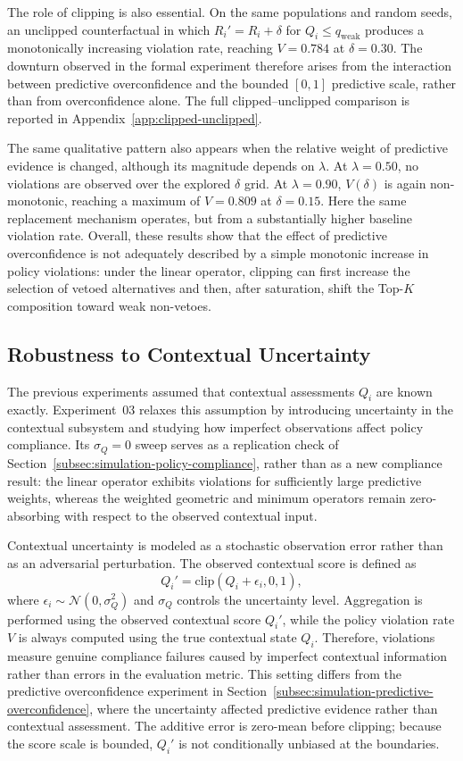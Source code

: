 \documentclass[mathematics,article,submit,moreauthors]{Definitions/mdpi}
\begin{document}
The role of clipping is also essential. On the same populations and
random seeds, an unclipped counterfactual in which
$R_i'=R_i+\delta$ for $Q_i\le q_{\mathrm{weak}}$ produces a monotonically
increasing violation rate, reaching $V=0.784$ at $\delta=0.30$. The
downturn observed in the formal experiment therefore arises from the
interaction between predictive overconfidence and the bounded
$[0,1]$ predictive scale, rather than from overconfidence alone. The
full clipped--unclipped comparison is reported in
Appendix~\ref{app:clipped-unclipped}.

The same qualitative pattern also appears when the relative weight of
predictive evidence is changed, although its magnitude depends on
$\lambda$. At $\lambda=0.50$, no violations are observed over the
explored $\delta$ grid. At $\lambda=0.90$, $V(\delta)$ is again
non-monotonic, reaching a maximum of $V=0.809$ at $\delta=0.15$.
Here the same replacement mechanism operates, but from a substantially
higher baseline violation rate. Overall, these results show that the
effect of predictive overconfidence is not adequately described by a
simple monotonic increase in policy violations: under the linear
operator, clipping can first increase the selection of vetoed
alternatives and then, after saturation, shift the Top-$K$ composition
toward weak non-vetoes.

\subsection{Robustness to Contextual Uncertainty}
\label{subsec:simulation-contextual-uncertainty}

{\color{blue}The previous experiments assumed that contextual assessments
$Q_i$ are known exactly. Experiment~03 relaxes this assumption by
introducing uncertainty in the contextual subsystem and studying how
imperfect observations affect policy compliance. Its $\sigma_Q=0$ sweep
serves as a replication check of
Section~\ref{subsec:simulation-policy-compliance}, rather than as a new
compliance result: the linear operator exhibits violations for sufficiently
large predictive weights, whereas the weighted geometric and minimum
operators remain zero-absorbing with respect to the observed contextual
input.}

Contextual uncertainty is modeled as a stochastic observation error rather
than as an adversarial perturbation. The observed contextual score is
defined as
\[
Q_i'=\mathrm{clip}(Q_i+\epsilon_i,0,1),
\]
where $\epsilon_i\sim\mathcal{N}(0,\sigma_Q^2)$ and $\sigma_Q$ controls
the uncertainty level. Aggregation is performed using the observed
contextual score $Q_i'$, while the policy violation rate $V$ is always
computed using the true contextual state $Q_i$. Therefore, violations
measure genuine compliance failures caused by imperfect contextual
information rather than errors in the evaluation metric. This setting
differs from the predictive overconfidence experiment in
Section~\ref{subsec:simulation-predictive-overconfidence}, where the
uncertainty affected predictive evidence rather than contextual
assessment.
{\color{blue}The additive error is zero-mean before clipping; because the
score scale is bounded, $Q_i'$ is not conditionally unbiased at the
boundaries.}
\end{document}
